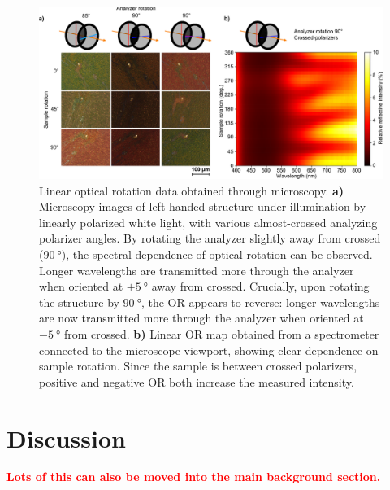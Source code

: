 \begin{figure}[htb!]	
    \centering	
    \includegraphics[scale=0.8]{./figures/results/OAinPlanarNanohelices/lin_data.pdf}

    \caption{\label{fig:results:OAinPlanarNanohelices:lin_data}
    Linear optical rotation data obtained through microscopy. \textbf{a)} Microscopy images of left-handed structure under illumination by linearly polarized white light, with various almost-crossed analyzing polarizer angles. By rotating the analyzer slightly away from crossed ($\SI{90}{\degree}$), the spectral dependence of optical rotation can be observed. Longer wavelengths are transmitted more through the analyzer when oriented at $+\SI{5}{\degree}$ away from crossed. Crucially, upon rotating the structure by $\SI{90}{\degree}$, the OR appears to reverse: longer wavelengths are now transmitted more through the analyzer when oriented at $-\SI{5}{\degree}$ from crossed. \textbf{b)} Linear OR map obtained from a spectrometer connected to the microscope viewport, showing clear dependence on sample rotation. Since the sample is between crossed polarizers, positive and negative OR both increase the measured intensity.}
\end{figure}

\section{Discussion}\label{sec:results:OAinPlanarNanohelices:discussion}
\textcolor{red}{
\textbf{Lots of this can also be moved into the main background section.}
}

